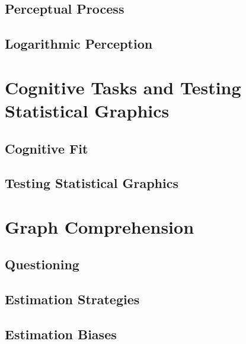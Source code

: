 \documentclass[print]{nuthesis}
\begin{document}
\hypertarget{perceptual-process}{%
\subsection{Perceptual Process}\label{perceptual-process}}

\hypertarget{logarithmic-perception}{%
\subsection{Logarithmic Perception}\label{logarithmic-perception}}

\hypertarget{cognitive-tasks-and-testing-statistical-graphics}{%
\section{Cognitive Tasks and Testing Statistical Graphics}\label{cognitive-tasks-and-testing-statistical-graphics}}

\hypertarget{cognitive-fit}{%
\subsection{Cognitive Fit}\label{cognitive-fit}}

\hypertarget{testing-statistical-graphics}{%
\subsection{Testing Statistical Graphics}\label{testing-statistical-graphics}}

\hypertarget{graph-comprehension}{%
\section{Graph Comprehension}\label{graph-comprehension}}

\hypertarget{questioning}{%
\subsection{Questioning}\label{questioning}}

\hypertarget{estimation-strategies}{%
\subsection{Estimation Strategies}\label{estimation-strategies}}

\hypertarget{estimation-biases}{%
\subsection{Estimation Biases}\label{estimation-biases}}
\end{document}
